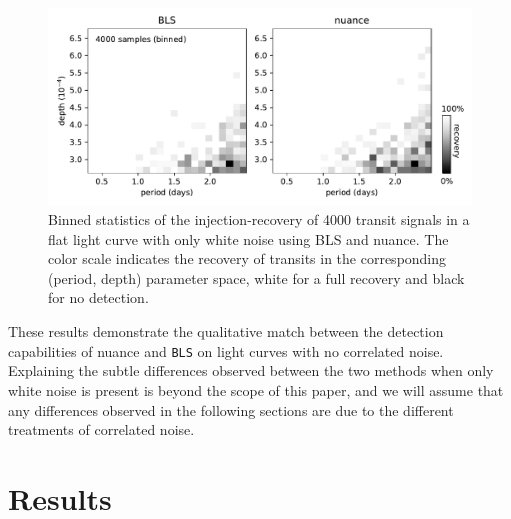 \documentclass[modern]{aastex631}
\newcommand{\nuancecode}{\textsf{nuance}}
\begin{document}
\begin{figure}[H]
    \begin{centering}
        \includegraphics[width=\linewidth]{../workflows/control_test_bls/figures/control_test.pdf}
        \caption{Binned statistics of the injection-recovery of 4000 transit signals in a flat light curve with only white noise using \textsf{BLS} and \nuancecode{}. The color scale indicates the recovery of transits in the corresponding (period, depth) parameter space, white for a full recovery and black for no detection.}
        \label{fig:control}
    \end{centering}
\end{figure}

These results demonstrate the qualitative match between the detection capabilities of \textsf{nuance} and \texttt{BLS} on light curves with no correlated noise. Explaining the subtle differences observed between the two methods when only white noise is present is beyond the scope of this paper, and we will assume that any differences observed in the following sections are due to the different treatments of correlated noise.

\newpage
\section{Results}\label{results}
\end{document}
